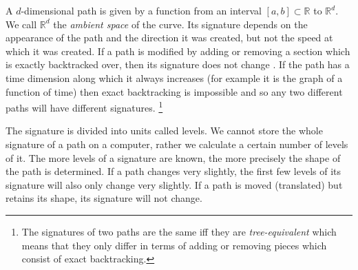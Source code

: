 A $d$-dimensional path is given by a function %
from an interval $[a,b]\subset\mathbb{R}$ to $\mathbb{R}^d$. 
We call $\mathbb{R}^d$ the \emph{ambient space} of the curve.
Its signature depends on the appearance of the path and the direction it was created, but not the speed at which it was created. If a path is modified by adding or removing a section which is exactly backtracked over, then its signature does not change \cite{HL}. If the path has a time dimension along which it always increases (for example it is the graph of a function of time) then exact backtracking is impossible and so any two different paths will have different signatures.%
\footnote{The signatures of two paths are the same iff they are \emph{tree-equivalent} \cite{HL} which means that they only differ in terms of adding or removing pieces which consist of exact backtracking.}

The signature is divided into units called levels. We cannot store the whole signature of a path on a computer, rather we calculate a certain number of levels of it. 
The more levels of a signature are known, the more precisely the shape of the path is determined.
If a path changes very slightly, the first few levels of its signature will also only change very slightly. If a path is moved (translated) but retains its shape, its signature will not change. 

